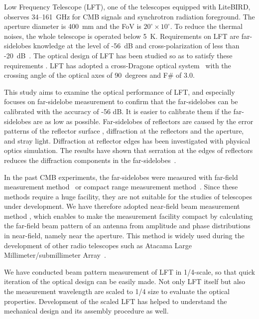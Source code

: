 \documentclass[journal]{IEEEtran}
\newcommand{\red}[1]{\textcolor{red}{#1}}
\begin{document}
\par
Low Frequency Telescope (LFT), one of the telescopes equipped with LiteBIRD, observes 34--161~GHz for CMB signals and synchrotron radiation foreground. The aperture diameter is 400~mm and the FoV is $20^\circ \times 10^\circ$. To reduce the thermal noises, the whole telescope is operated below 5~K.
Requirements on LFT are far-sidelobes knowledge at the level of -56~dB and cross-polarization of less than -20~dB~\cite{Sekimoto2018}. The optical design of LFT has been studied so as to satisfy these requirements \cite{Kashima2018,Imada2018}.
LFT has adopted a cross-Dragone optical system~\cite{Dragone1978} with the crossing angle of the optical axes of 90~degrees and F\# of 3.0.
\par
This study aims to examine the optical performance of LFT, and especially focuses on far-sidelobe measurement to confirm that the far-sidelobes can be calibrated with the accuracy of -56 dB. 
It is easier to calibrate them if the far-sidelobes are as low as possible. 
Far-sidelobes of reflectors are caused by the error patterns of the reflector surface \cite{Baars1973}, diffraction at the reflectors and the aperture, and stray light.
Diffraction at reflector edges has been investigated with physical optics simulation. The results have shown that serration at the edges of reflectors reduces the diffraction components in the far-sidelobes~\cite{Imada2018}.
\par
In the past CMB experiments, the far-sidelobes were measured with far-field measurement method~\cite{Takahashi2010} or compact range measurement method~\cite{Forma2009,Tauber2010}. Since these methods require a huge facility, they are not suitable for the studies of telescopes under development. We have therefore adopted near-field beam measurement method \cite{Yaghjian1986,Slater1991}, which enables to make the measurement facility compact by calculating the far-field beam pattern of an antenna from amplitude and phase distributions in near-field, namely near the aperture. This method is widely used during the development of other radio telescopes such as Atacama Large Millimeter/submillimeter Array~\cite{Naruse2009,Gonzalez2016}. 
\par
We have conducted beam pattern measurement of LFT in 1/4-scale,  so that quick iteration of the optical design can be easily made. Not only LFT itself but also the measurement wavelength are scaled to 1/4 size to evaluate the optical properties.
Development of the scaled LFT has helped to understand the mechanical design and its assembly procedure as well.
%
%
\end{document}
